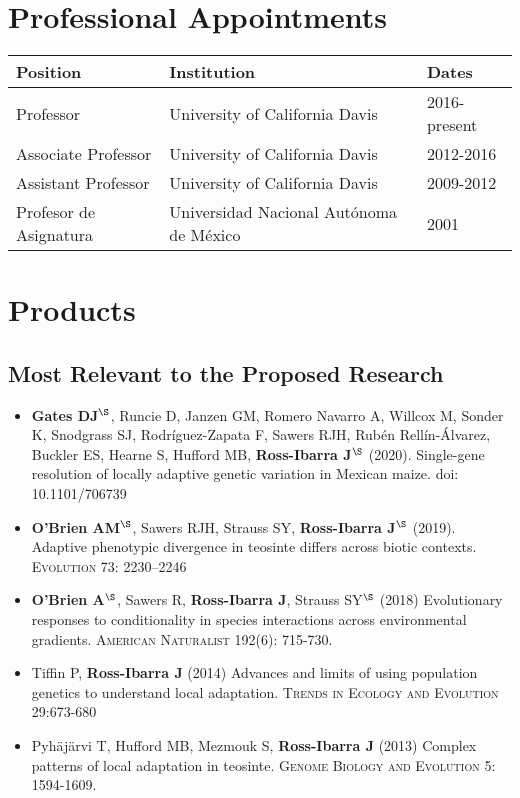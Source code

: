 \documentclass[10pt]{article}
\begin{document}
\section{Professional Appointments}

\begin{tabular}{l l l}
Position & Institution                 & Dates\\
\hline
Professor & University of California Davis &		2016-present \\
Associate Professor & University of California Davis &		2012-2016 \\
Assistant Professor & University of California Davis &		2009-2012 \\
Profesor de Asignatura & Universidad Nacional Aut\'{o}noma de M\'{e}xico & 2001 \\
\end{tabular}

\section{Products}

\subsection*{Most Relevant to the Proposed Research}

\begin{itemize} \setlength{\itemsep}{0pt} \setlength{\parskip}{2pt} \setlength{\parsep}{0pt}


\item \textbf{Gates DJ}$^\S$, Runcie D, Janzen GM, Romero Navarro A,  Willcox M,  Sonder K, Snodgrass SJ, Rodr\'{i}guez-Zapata F,  Sawers RJH, Rub\'{e}n Rell\'{i}n-\'{A}lvarez, Buckler ES, Hearne S, Hufford MB, \textbf{Ross-Ibarra J}$^\S$ (2020). Single-gene resolution of locally adaptive genetic variation in Mexican maize. doi: 10.1101/706739

\item \textbf{O'Brien AM}$^\S$, Sawers RJH, Strauss SY, \textbf{Ross-Ibarra J}$^\S$ (2019). Adaptive phenotypic divergence in teosinte differs across biotic contexts. \textsc{Evolution} 73: 2230--2246

\item \textbf{O'Brien A}$^\S$, Sawers R, \textbf{Ross-Ibarra J}, Strauss  SY$^\S$ (2018) Evolutionary responses to conditionality in species interactions across environmental gradients. \textsc{American Naturalist} 192(6): 715-730.

\item Tiffin P, {\bf Ross-Ibarra J} (2014) Advances and limits of using population genetics to understand local adaptation. \textsc{Trends in Ecology and Evolution} 29:673-680 %

\item {Pyh\"aj\"arvi T}, {Hufford MB}, {Mezmouk S}, {\bf Ross-Ibarra J} (2013) Complex patterns of local adaptation in teosinte. \textsc{Genome Biology and Evolution} 5: 1594-1609.


\end{itemize}
\end{document}
